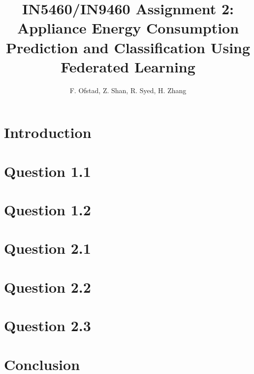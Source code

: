 \documentclass{article}
\title{\textbf{IN5460/IN9460 Assignment 2: Appliance Energy Consumption Prediction and
Classification Using Federated Learning}}
\author{F. Ofstad, Z. Shan, R. Syed, H. Zhang}
\date{}
\begin{document}
\maketitle

\section{Introduction}

\section{Question 1.1}

\section{Question 1.2}

\section{Question 2.1}

\section{Question 2.2}

\section{Question 2.3}

\section{Conclusion}



\vspace*{10mm}
\end{document}
